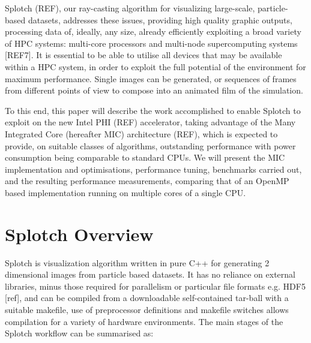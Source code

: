 \documentclass[runningheads,a4paper]{llncs}
\begin{document}
Splotch (REF), our ray-casting algorithm for visualizing large-scale, particle-based datasets, addresses these issues, 
providing high quality graphic outputs, processing data of, ideally, any size, already efficiently exploiting a broad 
variety of HPC systems: multi-core processors and multi-node supercomputing systems [REF7]. It is essential to be able 
to utilise all devices that may be available within a HPC system, in order to exploit the full potential of the 
environment for maximum performance. Single images can be generated, or sequences of frames from different points of 
view to compose into an animated film of the simulation.

To this end, this paper will describe the work accomplished to enable Splotch to exploit on the new Intel PHI (REF) 
accelerator, taking advantage of the Many Integrated Core (hereafter MIC) architecture (REF), which is expected to provide, 
on suitable classes of algorithms, outstanding performance with power consumption being comparable to standard CPUs. 
We will present the MIC implementation and optimisations, performance tuning, benchmarks carried out, and the resulting 
performance measurements, comparing that of an OpenMP based implementation running on multiple cores of a single CPU. 

\section{Splotch Overview}
\label{sect:overview}


Splotch is visualization algorithm written in pure C++ for generating 2 dimensional images from particle based datasets. 
It has no reliance on external libraries, minus those required for parallelism or particular file formats 
e.g. HDF5 [ref], and can be compiled from a downloadable self-contained tar-ball with a suitable makefile, use of 
preprocessor definitions and makefile switches allows compilation for a variety of hardware environments. The main stages 
of the Splotch workflow can be summarised as:
\end{document}
